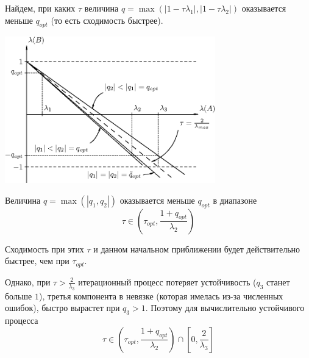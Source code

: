 \documentclass[professionalfonts,compress,unicode]{beamer}
\begin{document}
{
    Найдем, при каких $\tau$ величина 
    $q = \max(|1 - \tau \lambda_1|, |1 - \tau \lambda_2|)$ 
    оказывается меньше $q_{opt}$ (то есть сходимость быстрее).
    \begin{center}
    \includegraphics[height=2.5in]{special-0.eps}
    \end{center}
}

{
    Величина $q = \max(|q_1,q_2|)$ оказывается меньше $q_{opt}$
    в диапазоне 
    \begin{equation*}
        \tau \in \left(\tau_{opt}, \frac{1+q_{opt}}{\lambda_2}\right)
    \end{equation*}

    Сходимость при этих $\tau$ и данном начальном приближении будет
    действительно быстрее, чем при $\tau_{opt}$.

    Однако, при $\tau > \frac{2}{\lambda_3}$ итерационный процесс потеряет
    устойчивость ($q_3$ станет больше $1$), третья компонента в невязке
    (которая имелась из-за численных ошибок), 
    быстро вырастет при $q_3 > 1$. Поэтому для вычислительно устойчивого 
    процесса 
    \begin{equation*}
        \tau \in \left(\tau_{opt}, \frac{1+q_{opt}}{\lambda_2}\right) \cap
        \left[0, \frac{2}{\lambda_3}\right]
    \end{equation*}
}
\end{document}
